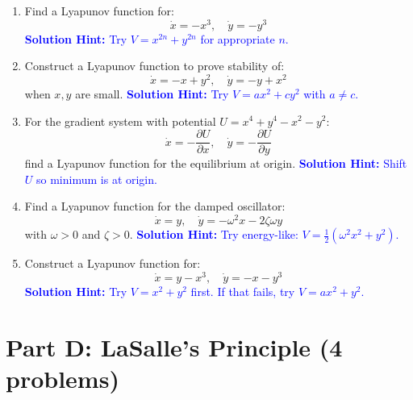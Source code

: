 \documentclass[12pt]{article}
\newcommand{\solution}[1]{\textcolor{blue}{\textbf{Solution Hint:} #1}}
\begin{document}
\begin{enumerate}[resume]
\item Find a Lyapunov function for:
$$\dot{x} = -x^3, \quad \dot{y} = -y^3$$
\solution{Try $V = x^{2n} + y^{2n}$ for appropriate $n$.}

\item Construct a Lyapunov function to prove stability of:
$$\dot{x} = -x + y^2, \quad \dot{y} = -y + x^2$$
when $x,y$ are small.
\solution{Try $V = ax^2 + cy^2$ with $a \neq c$.}

\item For the gradient system with potential $U = x^4 + y^4 - x^2 - y^2$:
$$\dot{x} = -\frac{\partial U}{\partial x}, \quad \dot{y} = -\frac{\partial U}{\partial y}$$
find a Lyapunov function for the equilibrium at origin.
\solution{Shift $U$ so minimum is at origin.}

\item Find a Lyapunov function for the damped oscillator:
$$\dot{x} = y, \quad \dot{y} = -\omega^2 x - 2\zeta\omega y$$
with $\omega > 0$ and $\zeta > 0$.
\solution{Try energy-like: $V = \frac{1}{2}(\omega^2x^2 + y^2)$.}

\item Construct a Lyapunov function for:
$$\dot{x} = y - x^3, \quad \dot{y} = -x - y^3$$
\solution{Try $V = x^2 + y^2$ first. If that fails, try $V = ax^2 + y^2$.}
\end{enumerate}

\section*{Part D: LaSalle's Principle (4 problems)}
\end{document}
